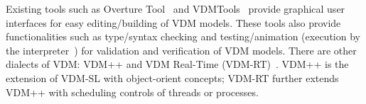 Existing tools such as Overture Tool~\cite{Larsen:2010:OII:1668862.1668864} and VDMTools~\cite{2008:VAS:1361213.1361214} provide graphical user interfaces for easy editing/building of VDM models. These tools also provide functionalities such as type/syntax checking and testing/animation (execution by the interpreter~\cite{Prehn:1991:LNCS551}) for validation and verification of VDM models. There are other dialects of VDM: VDM++ and VDM Real-Time (VDM-RT)~\cite{10.1007/11813040_11}. VDM++ is the extension of VDM-SL with object-orient concepts; VDM-RT further extends VDM++ with scheduling controls of threads or processes.
